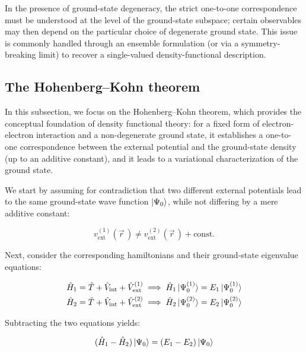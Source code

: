 In the presence of ground-state degeneracy, the strict one-to-one correspondence must be understood at the level of the ground-state subspace; certain observables may then depend on the particular choice of degenerate ground state. This issue is commonly handled through an ensemble formulation (or via a symmetry-breaking limit) to recover a single-valued density-functional description.

\subsection{The Hohenberg--Kohn theorem}

In this subsection, we focus on the Hohenberg--Kohn theorem, which provides the conceptual foundation of density functional theory: for a fixed form of electron-electron interaction and a non-degenerate ground state, it establishes a one-to-one correspondence between the external potential and the ground-state density (up to an additive constant), and it leads to a variational characterization of the ground state.

We start by assuming for contradiction that two different external potentials lead to the same ground-state wave function $\ket{\Psi_0}$, while not differing by a mere additive constant:

\begin{equation}
    v^{(1)}_\mathrm{ext}(\vec{r}\,)\neq v^{(2)}_\mathrm{ext}(\vec{r}\,)+\mathrm{const.}
\label{V_ext}
\end{equation}

Next, consider the corresponding hamiltonians and their ground-state eigenvalue equations:

\begin{equation}
\begin{aligned}
    \hat{H}_1=\hat{T}+\hat{V}_\mathrm{int}+\hat{V}_\mathrm{ext}^{(1)} &\implies \hat{H}_1\ket{\Psi_0^{(1)}}=E_1\ket{\Psi_0^{(1)}} \\
    \hat{H}_2=\hat{T}+\hat{V}_\mathrm{int}+\hat{V}_\mathrm{ext}^{(2)} &\implies \hat{H}_2\ket{\Psi_0^{(2)}}=E_2\ket{\Psi_0^{(2)}}
\end{aligned}
\label{different_hamiltonians_schrodinger_equation}
\end{equation}

Subtracting the two equations yields:

\begin{equation}
    (\hat{H}_1-\hat{H}_2)\ket{\Psi_0}=(E_1-E_2)\ket{\Psi_0}
\label{difference_eigen}
\end{equation}

